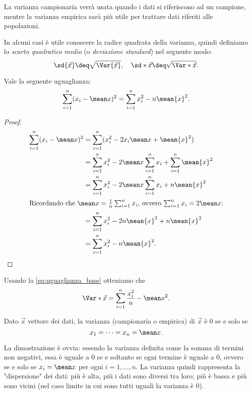 La varianza campionaria verrà usata quando i dati si riferiscono ad un campione, mentre la varianza empirica sarà più utile per trattare dati riferiti alle popolazioni.

In alcuni casi è utile conoscere la radice quadrata della varianza, quindi definiamo lo \emph{scarto quadratico medio} (o \emph{deviazione standard}) nel seguente modo: \begin{equation}
    \sd{\vec x} \deq \sqrt{\Var{\vec x}}, \quad \sd*{\vec x} \deq \sqrt{\Var*{\vec x}}.
\end{equation}

\begin{proposition}
    Vale la seguente uguaglianza: \begin{equation} \label{eq:uguaglianza_base}
        \sum_{i=1}^n (x_i - \mean x)^2 = \sum_{i=1}^n x_i^2 - n\mean{x}^2.
    \end{equation}
\end{proposition}
\begin{proof}
    \begin{align*}
        \sum_{i=1}^n (x_i - \mean x)^2 &= \sum_{i=1}^n (x_i^2 - 2x_i\mean x + \mean{x}^2)\\
        &= \sum_{i=1}^n x_i^2 - 2\mean x\sum_{i=1}^n x_i + \sum_{i=1}^n \mean{x}^2\\
        &= \sum_{i=1}^n x_i^2 - 2\mean x\sum_{i=1}^n x_i + n\mean{x}^2\\
        \intertext{Ricordando che $\mean x = \frac1n \sum_{i=1}^n x_i$, ovvero $\sum_{i=1}^n x_i = 2\mean x$:}
        &= \sum_{i=1}^n x_i^2 - 2n\mean{x}^2 + n\mean{x}^2\\
        &= \sum_{i=1}^n x_i^2 - n\mean{x}^2. \qedhere
    \end{align*}
\end{proof}

Usando la \eqref{eq:uguaglianza_base} otteniamo che \[
    \Var*{\vec x} = \sum_{i=1}^n \frac{x_i^2}{n} - \mean x^2.
\]

\begin{proposition}
    Dato $\vec x$ vettore dei dati, la varianza (campionaria o empirica) di $\vec x$ è $0$ se e solo se \[
        x_1 = \dots = x_n = \mean x.    
    \]
\end{proposition}
La dimostrazione è ovvia: essendo la varianza definita come la somma di termini non negativi, essa è uguale a $0$ se e soltanto se ogni termine è uguale a $0$, ovvero se e solo se $x_i = \mean x$ per ogni $i = 1, \dots, n$. La varianza quindi rappresenta la "dispersione" dei dati: più è alta, più i dati sono diversi tra loro; più è bassa e più sono vicini (nel caso limite in cui sono tutti uguali la varianza è $0$).


